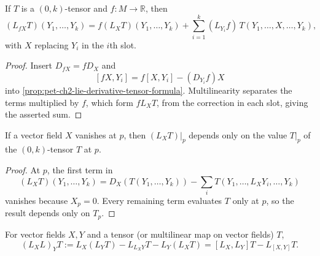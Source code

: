 \begin{proposition}
  \label{prop:pet-ch2-lie-derivative-scaling}
  \leanok
  If $T$ is a $(0,k)$-tensor and $f:M\to\mathbb{R}$, then
  \[
    (L_{fX}T)(Y_1,\dots,Y_k)
    = f(L_XT)(Y_1,\dots,Y_k)+\sum_{i=1}^k(L_{Y_i}f)\,T(Y_1,\dots,X,\dots,Y_k),
  \]
  with $X$ replacing $Y_i$ in the $i$th slot.
\end{proposition}
\begin{proof}
  \leanok
  \sketch
  Insert
  $D_{fX}=fD_X$ and
  \[
    [fX,Y_i]=f[X,Y_i]-(D_{Y_i}f)X
  \]
  into \cref{prop:pet-ch2-lie-derivative-tensor-formula}. Multilinearity
  separates the terms multiplied by $f$, which form $fL_XT$, from the
  correction in each slot, giving the asserted sum.
\end{proof}

\begin{lemma}
  \label{lem:pet-ch2-lie-derivative-local-vanishing}
  \leanok
  If a vector field $X$ vanishes at $p$, then $(L_XT)|_p$ depends only on the
  value $T|_p$ of the $(0,k)$-tensor $T$ at $p$.
\end{lemma}
\begin{proof}
  \leanok
  \sketch
  At $p$, the first term in
  \[
    (L_XT)(Y_1,\dots,Y_k)
      =D_X(T(Y_1,\dots,Y_k))
       -\sum_iT(Y_1,\dots,L_XY_i,\dots,Y_k)
  \]
  vanishes because $X_p=0$. Every remaining term evaluates $T$ only at $p$,
  so the result depends only on $T_p$.
\end{proof}

\begin{definition}
  \label{def:pet-ch2-generalized-lie-derivative}
  \leanok
  For vector fields $X,Y$ and a tensor (or multilinear map on vector fields)
  $T$,
  \[
    (L_XL)_YT := L_X(L_YT)-L_{L_XY}T-L_Y(L_XT) = [L_X,L_Y]T-L_{[X,Y]}T.
  \]
\end{definition}

